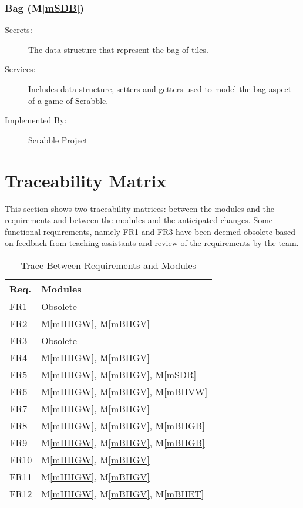 \documentclass[12pt, titlepage]{article}
\newcommand{\mref}[1]{M\ref{#1}}
\begin{document}
\subsubsection{Bag (\mref{mSDB})}
\begin{description}
\item[Secrets:] The data structure that represent the bag of tiles.
\item[Services:] Includes data structure, setters and getters used to model the bag aspect of a game of Scrabble.
\item[Implemented By:] Scrabble Project
\end{description}


\section{Traceability Matrix} \label{SecTM} %

This section shows two traceability matrices: between the modules and the
requirements and between the modules and the anticipated changes. Some functional requirements, namely FR1 and FR3 have been deemed obsolete based on feedback from teaching assistants and review of the requirements by the team.
 
\begin{table}[H]
\centering
\begin{tabular}{p{} p{}}
\toprule
\textbf{Req.} & \textbf{Modules}\\
\midrule
FR1 & Obsolete \\
FR2 & \mref{mHHGW}, \mref{mBHGV}\\
FR3 & Obsolete \\
FR4 & \mref{mHHGW}, \mref{mBHGV}\\
FR5 & \mref{mHHGW}, \mref{mBHGV}, \mref{mSDR}\\
FR6 & \mref{mHHGW}, \mref{mBHGV}, \mref{mBHVW}\\
FR7 & \mref{mHHGW}, \mref{mBHGV}\\
FR8 & \mref{mHHGW}, \mref{mBHGV}, \mref{mBHGB}\\
FR9 & \mref{mHHGW}, \mref{mBHGV}, \mref{mBHGB}\\
FR10 & \mref{mHHGW}, \mref{mBHGV}\\
FR11 & \mref{mHHGW}, \mref{mBHGV}\\
FR12 & \mref{mHHGW}, \mref{mBHGV}, \mref{mBHET}\\
\bottomrule
\end{tabular}
\caption{Trace Between Requirements and Modules}
\label{TblRT}
\end{table}
\end{document}
